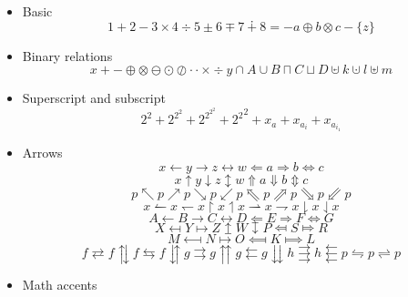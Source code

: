 \documentclass{article}
\begin{document}
\begin{itemize}
  \item Basic
        \[ 1 + 2 - 3 \times 4 \div 5 \pm 6 \mp 7 \dotplus 8 = -a \oplus b \otimes c -\{z\}\]

  \item Binary relations
        \[
          x + - \oplus \otimes \ominus \odot \oslash \cdot \cdotp \times \div
          y \cap A \cup B \sqcap C \sqcup D \cupleftarrow k \cupdot l \uplus m
        \]

  \item Superscript and subscript
        \[ 2^2 + 2^{2^2} + 2^{2^{2^2}} + {2^2}^2 + x_a + x_{a_i} + x_{a_{i_1}} \]

  \item Arrows
        \[
          x \leftarrow y \rightarrow z \leftrightarrow w
            \Leftarrow a \Rightarrow b \Leftrightarrow c
        \]
        \[
          x \uparrow   y \downarrow  z \updownarrow    w
            \Uparrow   a \Downarrow  b \Updownarrow    c
        \]
        \[
          p \nwarrow p \nearrow p \searrow p \swarrow p
            \Nwarrow p \Nearrow p \Searrow p \Swarrow p
        \]
        \[
          x \leftharpoonup    x \leftharpoondown  x
            \upharpoonright   x \upharpoonleft    x
            \rightharpoonup   x \rightharpoondown x
            \downharpoonright x \downharpoonleft  x
        \]
        \[
          A \longleftarrow B \longrightarrow C \longleftrightarrow D
            \Longleftarrow E \Longrightarrow F \Longleftrightarrow G
        \]
        \[
          X \mapsfrom Y \mapsto Z \mapsup W \mapsdown P \Mapsfrom S \Mapsto R
        \]
        \[
          M \longmapsfrom N \longmapsto O \Longmapsfrom K \Longmapsto L
        \]
        \[
          f \rightleftarrows  f \updownarrows f \leftrightarrows f \downuparrows
          g \rightrightarrows g \upuparrows   g \leftleftarrows  g \downdownarrows
          h \rightthreearrows h \leftthreearrows
          p \leftrightharpoons       p \rightleftharpoons
          p \]
  \item Math accents

\end{itemize}
\end{document}
